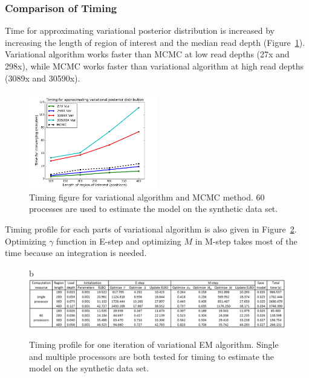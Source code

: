 \documentclass{article}
\begin{document}
\subsubsection*{Comparison of Timing}
Time for approximating variational posterior distribution is increased by increasing the length of region of interest and the median read depth (Figure~\ref{tbl:timing_mcmc_var}).
Variational algorithm works faster than MCMC at low read depths (27x and 298x), while MCMC works faster than variational algorithm at high read depths (3089x and 30590x).

\begin{figure}[htbp]
\centering
\vspace{-10pt}
\includegraphics[width=0.5\textwidth]{tables/timing_var_mcmc.png}
\caption{Timing figure for variational algorithm and MCMC method.
60 processes are used to estimate the model on the synthetic data set.}
\vspace{-10pt}
\label{tbl:timing_mcmc_var}
\end{figure}

Timing profile for each parts of variational algorithm is also given in Figure~\ref{tbl:timing_profile_all}.
Optimizing $\gamma$ function in E-step and optimizing $M$ in M-step takes most of the time because an integration is needed.

\begin{figure}{b}
\centering
\includegraphics[width=1.0\textwidth]{tables/time_3089X_all.png}
\caption{Timing profile for one iteration of variational EM algorithm.
Single and multiple processors are both tested for timing to estimate the model on the synthetic data set.}
\vspace{-10pt}
\label{tbl:timing_profile_all}
\end{figure}
\end{document}
